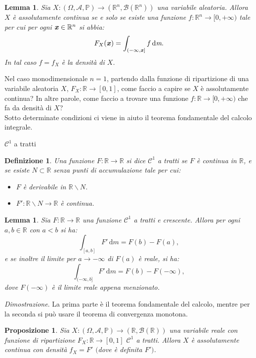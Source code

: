 \documentclass[11pt]{book}
\makeatletter
\theoremstyle{Definizione}
\newtheorem*{mydef}{Definizione}
\theoremstyle{TeoremaProposizioneLemmaCorollario}
\newtheorem{mylem}[myteo]{Lemma}
\newtheorem{mypropo}[myteo]{Proposizione}
\theoremstyle{OsservazioneNota}
\renewenvironment{proof}[1][\proofname]{\par
  \normalfont \topsep6\p@\@plus6\p@\relax
  \trivlist
  \item[\hskip\labelsep
        \itshape
    #1\@addpunct{.}]\ignorespaces
}{%
  \endtrivlist\@endpefalse
}
\newcommand{\R}{\mathbb{R}}
\newcommand{\tolto}{\smallsetminus}
\newcommand{\gri}[1]{\textbf{\textit{{#1}}}}
\renewcommand{\P}{\mathbb{P}}
\renewcommand{\d}{\mathrm{d}}
\newcommand{\dm}{\,\d \textit{m}}
\renewenvironment{proof}{\textsl{Dimostrazione}.}{}
\makeatother
\begin{document}
\begin{boxoss}
\begin{mylem}
Sia $X:(\Omega,\mathcal{A},\P) \longrightarrow (\R^n,\mathcal{B}(\R^n))$ una variabile aleatoria. Allora $X$ è assolutamente continua se e solo se esiste una funzione $f:\R^n \longrightarrow [0,+\infty)$ tale per cui per ogni $\gri{x}\in \R^n$ si abbia:
$$
F_X(\gri{x}) = \int_{(-\infty,\gri{x}]} f \dm.
$$
In tal caso $f = f_X$ è la densità di $X$.
\end{mylem}
\end{boxoss}
\noindent
Nel caso monodimensionale $n = 1$, partendo dalla funzione di ripartizione di una variabile aleatoria $X$, $F_X:\R\longrightarrow [0,1]$, come faccio a capire se $X$ è assolutamente continua? In altre parole, come faccio a trovare una funzione $f:\R\longrightarrow [0,+\infty)$ che fa da densità di $X$?\\
Sotto determinate condizioni ci viene in aiuto il teorema fondamentale del calcolo integrale.
\begin{boxdef}{$\mathcal{C}^1$ a tratti}
\begin{mydef}
Una funzione $F:\R\longrightarrow \R$ si dice $\mathcal{C}^1$ a tratti se $F$ è continua in $\R$, e se esiste $N\subset \R$ senza punti di accumulazione tale per cui:
\begin{itemize}
\item[$(i)$] $F$ è derivabile in $\R\tolto N$.
\item[$(ii)$] $F':\R\tolto N \longrightarrow \R$ è continua.
\end{itemize}
\end{mydef}
\end{boxdef}
\begin{boxoss}
\begin{mylem}
Sia $F:\R\longrightarrow \R$ una funzione $\mathcal{C}^1$ a tratti e crescente. Allora per ogni $a,b\in \R$ con $a < b$ si ha:
$$
\int_{[a,b]} F'\dm = F(b)-F(a),
$$
e se inoltre il limite per $a \to -\infty$ di $F(a)$ è reale, si ha:
$$
\int_{(-\infty,b]} F'\dm = F(b)-F(-\infty),
$$
dove $F(-\infty)$ è il limite reale appena menzionato.
\end{mylem}
\tcblower
\begin{proof}
La prima parte è il teorema fondamentale del calcolo, mentre per la seconda si può usare il teorema di convergenza monotona.
\end{proof}
\end{boxoss}
\begin{boxpro}
\begin{mypropo}
Sia $X:(\Omega,\mathcal{A},\P)\longrightarrow (\R,\mathcal{B}(\R))$ una variabile reale con funzione di ripartizione $F_X:\R \longrightarrow[0,1]$ $\mathcal{C}^1$ a tratti. Allora $X$ è assolutamente continua con densità $f_X = F'$ $($dove è definita $F')$.
\end{mypropo}
\end{boxpro}
\end{document}
